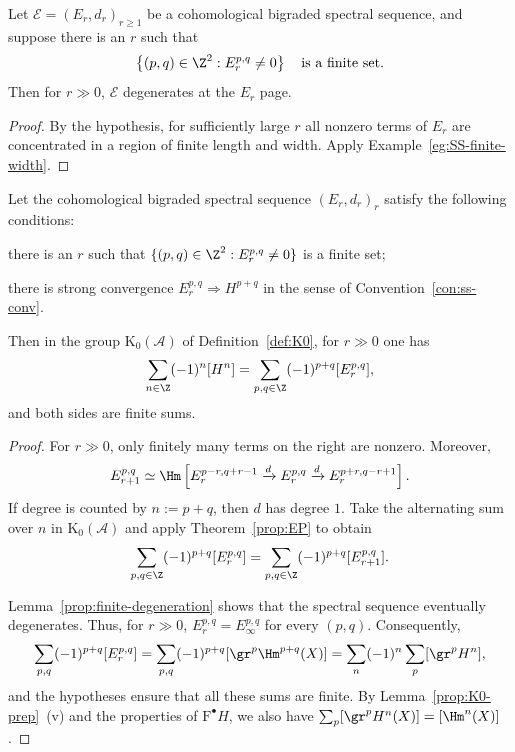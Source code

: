 \begin{lemma}\label{prop:finite-degeneration}
	Let $\mathscr{E}=(E_r,d_r)_{r\geq1}$ be a cohomological bigraded spectral
	sequence, and suppose there is an $r$ such that
	\[ \left\{(p,q)\in\Z^2:E_r^{p,q}\neq0\right\}
	\quad\text{is a finite set}. \]
	Then for $r\gg0$, $\mathscr{E}$ degenerates at the $E_r$ page.
\end{lemma}
\begin{proof}
	By the hypothesis, for sufficiently large $r$ all nonzero terms of $E_r$
	are concentrated in a region of finite length and width. Apply
	Example~\ref{eg:SS-finite-width}.
\end{proof}

\begin{proposition}\label{prop:EP-ss}
	Let the cohomological bigraded spectral sequence $(E_r,d_r)_r$ satisfy the
	following conditions:
	\begin{compactitem}
		\item there is an $r$ such that
		$\{(p,q)\in\Z^2:E_r^{p,q}\neq0\}$ is a finite set;
		\item there is strong convergence $E_r^{p,q}\Rightarrow H^{p+q}$ in
		the sense of Convention~\ref{con:ss-conv}.
	\end{compactitem}
	Then in the group $\mathrm{K}_0(\mathcal{A})$ of
	Definition~\ref{def:K0}, for $r\gg0$ one has
	\[ \sum_{n\in\Z}(-1)^n[H^n]
	=\sum_{p,q\in\Z}(-1)^{p+q}[E_r^{p,q}], \]
	and both sides are finite sums.
\end{proposition}
\begin{proof}
	For $r\gg0$, only finitely many terms on the right are nonzero. Moreover,
	\[ E_{r+1}^{p,q}\simeq\Hm\left[
	E_r^{p-r,q+r-1}\xrightarrow{d}E_r^{p,q}
	\xrightarrow{d}E_r^{p+r,q-r+1}\right]. \]
	If degree is counted by $n:=p+q$, then $d$ has degree $1$. Take the
	alternating sum over $n$ in $\mathrm{K}_0(\mathcal{A})$ and apply
	Theorem~\ref{prop:EP} to obtain
	\[ \sum_{p,q\in\Z}(-1)^{p+q}[E_r^{p,q}]
	=\sum_{p,q\in\Z}(-1)^{p+q}[E_{r+1}^{p,q}]. \]

	Lemma~\ref{prop:finite-degeneration} shows that the spectral sequence
	eventually degenerates. Thus, for $r\gg0$,
	$E_r^{p,q}=E_\infty^{p,q}$ for every $(p,q)$. Consequently,
	\[ \sum_{p,q}(-1)^{p+q}[E_r^{p,q}]
	=\sum_{p,q}(-1)^{p+q}[\gr^p\Hm^{p+q}(X)]
	=\sum_n(-1)^n\sum_p[\gr^pH^n], \]
	and the hypotheses ensure that all these sums are finite. By
	Lemma~\ref{prop:K0-prep}~(v) and the properties of
	$\mathrm{F}^\bullet H$, we also have
	$\sum_p[\gr^pH^n(X)]=[\Hm^n(X)]$.
\end{proof}

